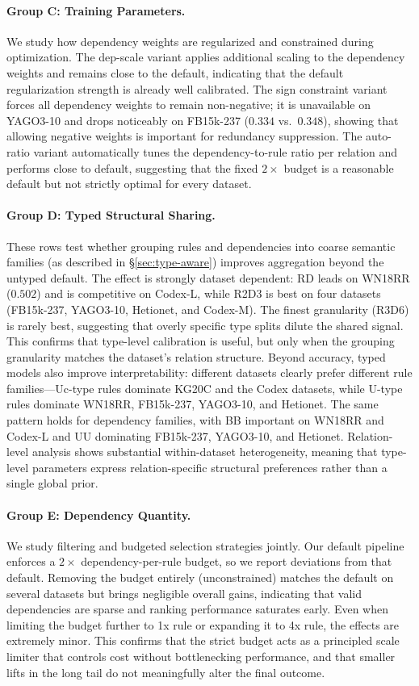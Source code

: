 \paragraph{Group C: Training Parameters.}
We study how dependency weights are regularized and constrained during optimization. The dep-scale variant applies additional scaling to the dependency weights and remains close to the default, indicating that the default regularization strength is already well calibrated. The sign constraint variant forces all dependency weights to remain non-negative; it is unavailable on YAGO3-10 and drops noticeably on FB15k-237 ($0.334$ vs.\ $0.348$), showing that allowing negative weights is important for redundancy suppression. The auto-ratio variant automatically tunes the dependency-to-rule ratio per relation and performs close to default, suggesting that the fixed $2\times$ budget is a reasonable default but not strictly optimal for every dataset.

\paragraph{Group D: Typed Structural Sharing.}
These rows test whether grouping rules and dependencies into coarse semantic families (as described in \S\ref{sec:type-aware}) improves aggregation beyond the untyped default. The effect is strongly dataset dependent: RD leads on WN18RR ($0.502$) and is competitive on Codex-L, while R2D3 is best on four datasets (FB15k-237, YAGO3-10, Hetionet, and Codex-M). The finest granularity (R3D6) is rarely best, suggesting that overly specific type splits dilute the shared signal. This confirms that type-level calibration is useful, but only when the grouping granularity matches the dataset's relation structure. Beyond accuracy, typed models also improve interpretability: different datasets clearly prefer different rule families---Uc-type rules dominate KG20C and the Codex datasets, while U-type rules dominate WN18RR, FB15k-237, YAGO3-10, and Hetionet. The same pattern holds for dependency families, with BB important on WN18RR and Codex-L and UU dominating FB15k-237, YAGO3-10, and Hetionet. Relation-level analysis shows substantial within-dataset heterogeneity, meaning that type-level parameters express relation-specific structural preferences rather than a single global prior.

\paragraph{Group E: Dependency Quantity.}
We study filtering and budgeted selection strategies jointly. Our default pipeline enforces a $2\times$ dependency-per-rule budget, so we report deviations from that default. Removing the budget entirely (unconstrained) matches the default on several datasets but brings negligible overall gains, indicating that valid dependencies are sparse and ranking performance saturates early. Even when limiting the budget further to 1x rule or expanding it to 4x rule, the effects are extremely minor. This confirms that the strict budget acts as a principled scale limiter that controls cost without bottlenecking performance, and that smaller lifts in the long tail do not meaningfully alter the final outcome.

